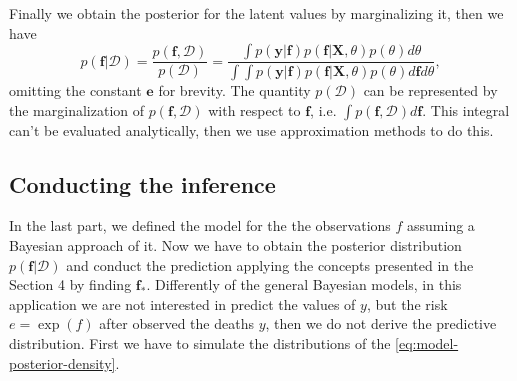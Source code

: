%
Finally we obtain the posterior for the latent values by marginalizing it, then we have
%
\begin{equation}
    p(\mathbf{f}|\mathcal{D})=
    \frac{p(\mathbf{f},\mathcal{D})}{p(\mathcal{D})}=
    \frac{\int p(\mathbf{y}|\mathbf{f})p(\mathbf{f}|\mathbf{X},\theta)p(\theta) d\theta}{\int \int p(\mathbf{y}|\mathbf{f})p(\mathbf{f}|\mathbf{X},\theta)p(\theta) d\mathbf{f} d\theta},
 \label{eq:model-posterior-density}
\end{equation}
%
omitting the constant $\mathbf{e}$ for brevity. The quantity $p(\mathcal{D})$ can be represented by the marginalization of $p(\mathbf{f},\mathcal{D})$ with respect to $\mathbf{f}$, i.e. $\int p(\mathbf{f},\mathcal{D}) d\mathbf{f}$. This integral can't be evaluated analytically, then we use approximation methods to do this.
%

\subsection{Conducting the inference}

In the last part, we defined the model for the the observations $f$ assuming a Bayesian approach of it. Now we have to obtain the posterior distribution $p(\mathbf{f}|\mathcal{D})$ and conduct the prediction applying the concepts presented in the {\color{red} Section 4} by finding $\mathbf{f}_*$. Differently of the general Bayesian models, in this application we are not interested in predict the values of $y$, but the risk $e=\exp(f)$ after observed the deaths $y$, then we do not derive the predictive distribution.
%
First we have to simulate the distributions of the \eqref{eq:model-posterior-density}.

